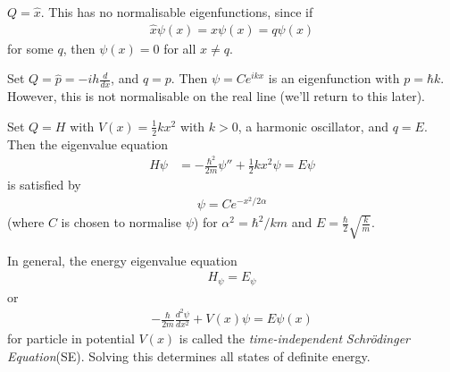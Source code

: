 \documentclass[a4paper]{article}
\begin{document}
\begin{eg}
$Q = \hat{x}$. This has no normalisable eigenfunctions, since if
\begin{equation*}
\begin{aligned}
\hat{x} \psi\left(x\right) = x\psi\left(x\right) = q\psi\left(x\right)
\end{aligned}
\end{equation*}
for some $q$, then $\psi\left(x\right) = 0$ for all $x\neq q$.
\end{eg}

\begin{eg}
Set $Q = \hat{p} = -ih\frac{d}{dx}$, and $q=p$. Then $\psi = C e^{ikx}$ is an eigenfunction with $p = \hbar k$. However, this is not normalisable on the real line (we'll return to this later).
\end{eg}

\begin{eg}
Set $Q=H$ with $V\left(x\right) = \frac{1}{2} kx^2$ with $k>0$, a harmonic oscillator, and $q = E$. Then the eigenvalue equation
\begin{equation*}
\begin{aligned}
H \psi &= -\frac{\hbar^2}{2m} \psi'' + \frac{1}{2} kx^2 \psi = E\psi
\end{aligned}
\end{equation*}
is satisfied by
\begin{equation*}
\begin{aligned}
\psi = Ce^{-x^2/2\alpha}
\end{aligned}
\end{equation*}
(where $C$ is chosen to normalise $\psi$) for $\alpha^2 = \hbar^2/km$ and $E = \frac{\hbar}{2} \sqrt{\frac{k}{m}}$.
\end{eg}

In general, the energy eigenvalue equation
\begin{equation*}
\begin{aligned}
H_\psi = E_\psi
\end{aligned}
\end{equation*}
or
\begin{equation*}
\begin{aligned}
-\frac{\hbar}{2m} \frac{d^2 \psi}{dx^2} +V\left(x\right) \psi = E\psi\left(x\right)
\end{aligned}
\end{equation*}
for particle in potential $V\left(x\right)$ is called the \emph{time-independent} \emph{Schr\"{o}dinger Equation}(SE). Solving this determines all states of definite energy.
\end{document}
